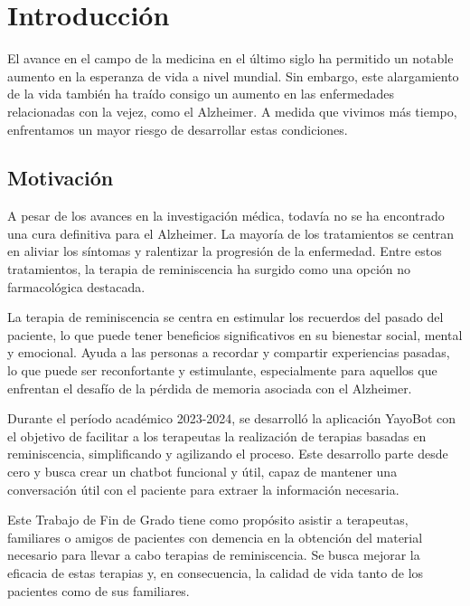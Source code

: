\chapter{Introducción}
\label{cap:introduccion}




El avance en el campo de la medicina en el último siglo ha permitido un notable aumento en la esperanza de vida a nivel mundial. Sin embargo, este alargamiento de la vida también ha traído consigo un aumento en las enfermedades relacionadas con la vejez, como el Alzheimer. A medida que vivimos más tiempo, enfrentamos un mayor riesgo de desarrollar estas condiciones.


\section{Motivación}

A pesar de los avances en la investigación médica, todavía no se ha encontrado una cura definitiva para el Alzheimer. La mayoría de los tratamientos se centran en aliviar los síntomas y ralentizar la progresión de la enfermedad. Entre estos tratamientos, la terapia de reminiscencia ha surgido como una opción no farmacológica destacada.

La terapia de reminiscencia se centra en estimular los recuerdos del pasado del paciente, lo que puede tener beneficios significativos en su bienestar social, mental y emocional. Ayuda a las personas a recordar y compartir experiencias pasadas, lo que puede ser reconfortante y estimulante, especialmente para aquellos que enfrentan el desafío de la pérdida de memoria asociada con el Alzheimer.

Durante el período académico 2023-2024, se desarrolló la aplicación YayoBot con el objetivo de facilitar a los terapeutas la realización de terapias basadas en reminiscencia, simplificando y agilizando el proceso. Este desarrollo parte desde cero y busca crear un chatbot funcional y útil, capaz de mantener una conversación útil con el paciente para extraer la información necesaria.

Este Trabajo de Fin de Grado tiene como propósito asistir a terapeutas, familiares o amigos de pacientes con demencia en la obtención del material necesario para llevar a cabo terapias de reminiscencia. Se busca mejorar la eficacia de estas terapias y, en consecuencia, la calidad de vida tanto de los pacientes como de sus familiares. 



